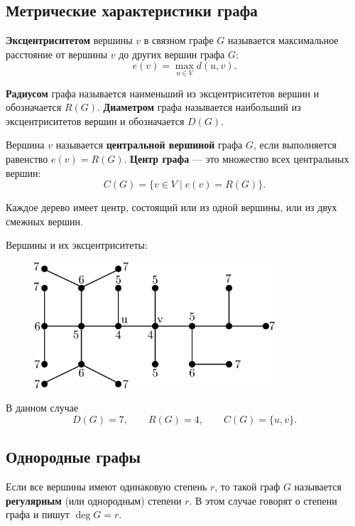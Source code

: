 \subsection{Метрические характеристики графа}

\textbf{Эксцентриситетом} вершины \(v\) в связном графе \(G\) называется максимальное расстояние от вершины \(v\) до других вершин графа \(G\):
\[
    e(v) = \max\limits_{u \in V} d(u, v).
\]

\textbf{Радиусом} графа называется наименьший из эксцентриситетов вершин и обозначается \(R(G)\). \textbf{Диаметром} графа называется наибольший из эксцентриситетов вершин и обозначается \(D(G)\).

Вершина \(v\) называется \textbf{центральной вершиной} графа \(G\), если выполняется равенство \(e(v) = R(G)\). \textbf{Центр графа} --- это множество всех центральных вершин:
\[
    C(G) = \{v \in V \mid e(v) = R(G)\}.
\]

\begin{theorem*}
    Каждое дерево имеет центр, состоящий или из одной вершины, или из двух смежных вершин.
\end{theorem*}

\begin{example*}
    Вершины и их эксцентриситеты:
    \begin{figure}[H]
        \centering
        \includegraphics[width=0.8\textwidth]{./images/eccentricities.png}
    \end{figure}

    В данном случае
    \[
        D(G) = 7,
        \qquad
        R(G) = 4,
        \qquad
        C(G) = \{u, v\}.
    \]
\end{example*}

\subsection{Однородные графы}

Если все вершины имеют одинаковую степень \(r\), то такой граф \(G\) называется \textbf{регулярным} (или однородным) степени \(r\). В этом случае говорят о степени графа и пишут \(\deg G = r\).

